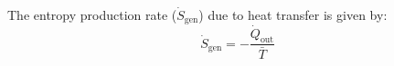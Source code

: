 The entropy production rate (\( \dot{S}_{\text{gen}} \)) due to heat transfer is given by:  
\[
\dot{S}_{\text{gen}} = -\frac{\dot{Q}_{\text{out}}}{\bar{T}}
\]